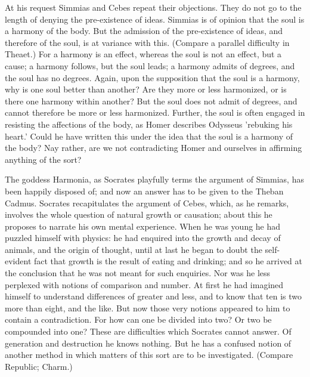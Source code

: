 At his request Simmias and Cebes repeat their objections. They do not go
to the length of denying the pre-existence of ideas. Simmias is of opinion
that the soul is a harmony of the body. But the admission of the
pre-existence of ideas, and therefore of the soul, is at variance with
this. (Compare a parallel difficulty in Theaet.) For a harmony is an
effect, whereas the soul is not an effect, but a cause; a harmony follows,
but the soul leads; a harmony admits of degrees, and the soul has no
degrees. Again, upon the supposition that the soul is a harmony, why is
one soul better than another? Are they more or less harmonized, or is
there one harmony within another? But the soul does not admit of degrees,
and cannot therefore be more or less harmonized. Further, the soul is
often engaged in resisting the affections of the body, as Homer describes
Odysseus 'rebuking his heart.' Could he have written this under the idea
that the soul is a harmony of the body? Nay rather, are we not
contradicting Homer and ourselves in affirming anything of the sort?

The goddess Harmonia, as Socrates playfully terms the argument of Simmias,
has been happily disposed of; and now an answer has to be given to the
Theban Cadmus. Socrates recapitulates the argument of Cebes, which, as he
remarks, involves the whole question of natural growth or causation; about
this he proposes to narrate his own mental experience. When he was young
he had puzzled himself with physics: he had enquired into the growth and
decay of animals, and the origin of thought, until at last he began to
doubt the self-evident fact that growth is the result of eating and
drinking; and so he arrived at the conclusion that he was not meant for
such enquiries. Nor was he less perplexed with notions of comparison and
number. At first he had imagined himself to understand differences of
greater and less, and to know that ten is two more than eight, and the
like. But now those very notions appeared to him to contain a
contradiction. For how can one be divided into two? Or two be compounded
into one? These are difficulties which Socrates cannot answer. Of
generation and destruction he knows nothing. But he has a confused notion
of another method in which matters of this sort are to be investigated.
(Compare Republic; Charm.)


